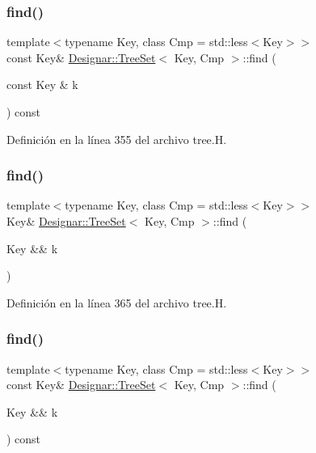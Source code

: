 \subsubsection{\texorpdfstring{find()}{find()}\hspace{0.1cm}{\footnotesize\ttfamily [2/4]}}
{\footnotesize\ttfamily template$<$typename Key, class Cmp = std\+::less$<$\+Key$>$$>$ \\
const Key\& \hyperlink{class_designar_1_1_tree_set}{Designar\+::\+Tree\+Set}$<$ Key, Cmp $>$\+::find (\begin{DoxyParamCaption}\item[{const Key \&}]{k }\end{DoxyParamCaption}) const\hspace{0.3cm}{\ttfamily [inline]}}



Definición en la línea 355 del archivo tree.\+H.

\mbox{\label{class_designar_1_1_tree_set_a40ba1bcb8ca94157e3890b3e81be4794}} 
\subsubsection{\texorpdfstring{find()}{find()}\hspace{0.1cm}{\footnotesize\ttfamily [3/4]}}
{\footnotesize\ttfamily template$<$typename Key, class Cmp = std\+::less$<$\+Key$>$$>$ \\
Key\& \hyperlink{class_designar_1_1_tree_set}{Designar\+::\+Tree\+Set}$<$ Key, Cmp $>$\+::find (\begin{DoxyParamCaption}\item[{Key \&\&}]{k }\end{DoxyParamCaption})\hspace{0.3cm}{\ttfamily [inline]}}



Definición en la línea 365 del archivo tree.\+H.

\mbox{\label{class_designar_1_1_tree_set_ad07353fe7781a5fe321f3f8b84fc23c7}} 
\subsubsection{\texorpdfstring{find()}{find()}\hspace{0.1cm}{\footnotesize\ttfamily [4/4]}}
{\footnotesize\ttfamily template$<$typename Key, class Cmp = std\+::less$<$\+Key$>$$>$ \\
const Key\& \hyperlink{class_designar_1_1_tree_set}{Designar\+::\+Tree\+Set}$<$ Key, Cmp $>$\+::find (\begin{DoxyParamCaption}\item[{Key \&\&}]{k }\end{DoxyParamCaption}) const\hspace{0.3cm}{\ttfamily [inline]}}



